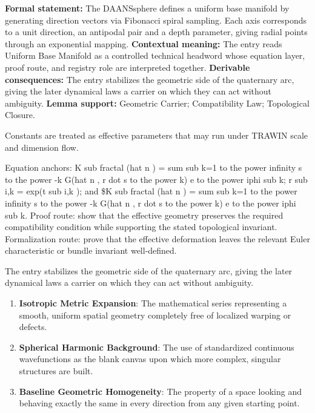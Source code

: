 \begingroup\footnotesize\setlength{\emergencystretch}{3em}\sloppy
\textbf{Formal statement:} The DAANSsphere defines a uniform base manifold by generating direction vectors via Fibonacci spiral sampling. Each axis corresponds to a unit direction, an antipodal pair and a depth parameter, giving radial points through an exponential mapping. \textbf{Contextual meaning:} The entry reads Uniform Base Manifold as a controlled technical headword whose equation layer, proof route, and registry role are interpreted together. \textbf{Derivable consequences:} The entry stabilizes the geometric side of the quaternary arc, giving the later dynamical laws a carrier on which they can act without ambiguity. \textbf{Lemma support:} Geometric Carrier; Compatibility Law; Topological Closure.\par
\endgroup

Constants are treated as effective parameters that may run under TRAWIN scale and dimension flow.

Equation anchors: K sub fractal (hat n ) = sum sub k=1 to the power infinity s to the power -k G(hat n , r dot s to the power k) e to the power iphi sub k; r sub i,k = exp(t sub i,k ); and \$K sub fractal (hat n ) = sum sub k=1 to the power infinity s to the power -k G(hat n , r dot s to the power k) e to the power iphi sub k. Proof route: show that the effective geometry preserves the required compatibility condition while supporting the stated topological invariant. Formalization route: prove that the effective deformation leaves the relevant Euler characteristic or bundle invariant well-defined.

The entry stabilizes the geometric side of the quaternary arc, giving the later dynamical laws a carrier on which they can act without ambiguity.
\endgroup

\begin{enumerate}[leftmargin=1.6em,itemsep=6pt,topsep=4pt]
\item \textbf{Isotropic Metric Expansion}: The mathematical series representing a smooth, uniform spatial geometry completely free of localized warping or defects.
\item \textbf{Spherical Harmonic Background}: The use of standardized continuous wavefunctions as the blank canvas upon which more complex, singular structures are built.
\item \textbf{Baseline Geometric Homogeneity}: The property of a space looking and behaving exactly the same in every direction from any given starting point.
\end{enumerate}

